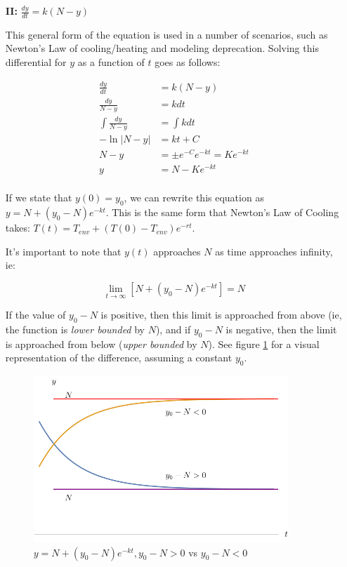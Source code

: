 \documentclass[12pt]{article}
\begin{document}
\begin{itemize}
    \item[\textbf{II:}] $\frac{dy}{dt} = k(N-y)$ 
    
    This general form of the equation is used in a number of scenarios, such as Newton's Law of cooling/heating and modeling deprecation. Solving this differential for $y$ as a function of $t$ goes as follows:
    
    \begin{equation}
        \begin{split}
            \frac{dy}{dt} &= k(N-y)\\
            \frac{dy}{N-y} &= k dt  \\
            \int \frac{dy}{N-y} &= \int k dt\\
            - \ln|N-y| &= kt + C\\
            N-y &= \pm e^{-C}e^{-kt} = Ke^{-kt}\\
            y &= N-Ke^{-kt}\\
        \end{split}
    \end{equation}
    
    If we state that $y(0) = y_0$, we can rewrite this equation as $y = N+(y_0-N)e^{-kt}$. This is the same form that Newton's Law of Cooling takes: $T(t) = T_{env} + (T(0) - T_{env})e^{-rt}$.
    
    It's important to note that $y(t)$ approaches $N$ as time approaches infinity, ie:
    
    $$\lim_{t\to\infty} [N+(y_0-N)e^{-kt}] = N$$
    
    If the value of $y_0-N$ is positive, then this limit is approached from above (ie, the function is \textit{lower bounded} by $N$), and if $y_0-N$ is negative, then the limit is approached from below (\textit{upper bounded} by $N$). See figure \ref{fig:newtonscooling} for a visual representation of the difference, assuming a constant $y_0$.
    
    \begin{figure}[!ht]
        \centering
        \includegraphics[width=9.6cm]{misc/newtonscooling.png}
        \caption{$y=N+(y_0-N)e^{-kt}, y_0-N > 0$ vs $y_0-N < 0$}
        \label{fig:newtonscooling}
    \end{figure}
    

\end{itemize}
\end{document}
